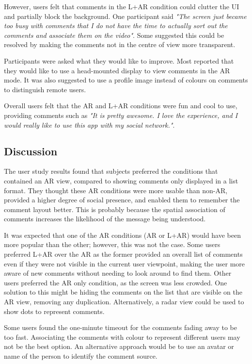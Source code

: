However, users felt that comments in the L+AR condition could clutter the UI and partially block the background. One participant said \textit{"The screen just became too busy with comments that I do not have the time to actually sort out the comments and associate them on the video"}. Some suggested this could be resolved by making the comments not in the centre of view more transparent.
 
Participants were asked what they would like to improve. Most reported that they would like to use a head-mounted display to view comments in the AR mode.  It was also suggested to use a profile image instead of colours on comments to distinguish remote users.
 
Overall users felt that the AR and L+AR conditions were fun and cool to use, providing comments such as \textit{"It is pretty awesome. I love the experience, and I would really like to use this app with my social network."}.


\subsection{Discussion}

The user study results found that subjects preferred the conditions that contained an AR view, compared to showing comments only displayed in a list format. They thought these AR conditions were more usable than non-AR, provided a higher degree of social presence, and enabled them to remember the comment layout better. This is probably because the spatial association of comments increases the likelihood of the message being understood.

It was expected that one of the AR conditions (AR or L+AR) would have been more popular than the other; however, this was not the case. Some users preferred L+AR over the AR as the former provided an overall list of comments even if they were not visible in the current user viewpoint, making the user more aware of new comments without needing to look around to find them. Other users preferred the AR only condition, as the screen was less crowded. One solution to this might be hiding the comments on the list that are visible on the AR view, removing any duplication. Alternatively, a radar view could be used to show dots to represent comments. 

Some users found the one-minute timeout for the comments fading away to be too fast. Associating the comments with colour to represent different users may not be the best option. An alternative approach would be to use an avatar or name of the person to identify the comment source. 


